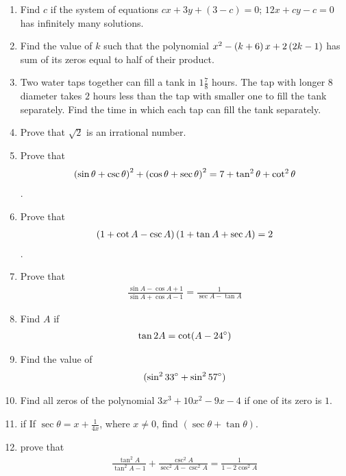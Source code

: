 \begin{enumerate}
  \item Find $c$ if the system of equations $cx+3y+(3-c)=0$; $12x+cy-c=0$ has infinitely many solutions.
  \item Find the value of $k$ such that the polynomial $x^2-\left(k+6\right)x+2\left(2k-1\right)$ has sum of its zeros equal to half of their product.
  \item Two water taps together can fill a tank in $1\frac{7}{8}$ hours. The tap with longer $8$ diameter takes $2$ hours less than the tap with smaller one to fill the tank separately. Find the time in which each tap can fill the tank separately.
  
  
  
  
  \item Prove that $\sqrt{2}$ is an irrational number.
  \item Prove that \begin{align*} \left(\sin\theta + \csc\theta\right)^2 + \left(\cos\theta + \sec\theta\right)^2 = 7 + \tan^2\theta + \cot^2\theta\end{align*}.
  \item Prove that \begin{align*}\left(1+\cot A - \csc A\right) \left(1 + \tan A +\sec A\right) = 2 \end{align*}.
  \item Prove that \begin{align*} \frac{\sin A-\cos A+1}{\sin A+ \cos A-1} =\frac{1}{\sec A-\tan A}\end{align*}
  \item Find $A$ if \begin{align*}\tan 2A = \cot (A-24\degree)\end{align*}
  \item Find the value of \begin{align*}(\sin^2 33\degree+ \sin^2 57\degree)\end{align*}
  
  
  \item Find all zeros of the polynomial $3x ^ 3 + 10x ^ 2 - 9x - 4$ if one of its zero is $1$.
   
  \item if If $\sec\theta = x + \frac{1}{4x}$, where $x \neq 0$, find $(\sec\theta + \tan\theta)$.
  \item prove that \begin{align*} \frac{\tan^2A}{\tan^2 A-1}+\frac{\csc^2 A}{\sec^2 A-\csc^2 A}=\frac{1}{1-2\cos^2 A}\end{align*}
  \end{enumerate}
